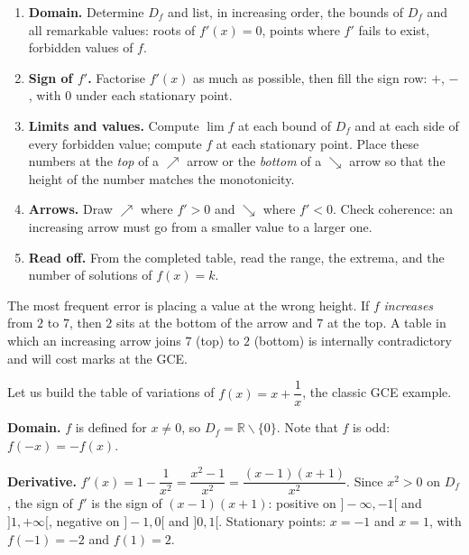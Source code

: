 \documentclass[11pt]{article}
\newcounter{popsec}
\newcounter{popsub}
\newcommand{\courssub}[1]{%
  \stepcounter{popsub}%
  \par\vspace{9pt}\noindent{\popxbold\fontsize{11.5}{13}\selectfont\color{popink}{\color{poporange}\thepopsec.\thepopsub}\hspace{6pt}#1}\par\nopagebreak\vspace{4pt}
}
\def\setminus{\mathbin{\backslash}}\let\smallsetminus\setminus
\begin{document}
\begin{methode}
\begin{enumerate}
\item \textbf{Domain.} Determine $D_f$ and list, in increasing order, the bounds of $D_f$ and all remarkable values: roots of $f'(x)=0$, points where $f'$ fails to exist, forbidden values of $f$.
\item \textbf{Sign of $f'$.} Factorise $f'(x)$ as much as possible, then fill the sign row: $+$, $-$, with $0$ under each stationary point.
\item \textbf{Limits and values.} Compute $\lim f$ at each bound of $D_f$ and at each side of every forbidden value; compute $f$ at each stationary point. Place these numbers at the \emph{top} of a $\nearrow$ arrow or the \emph{bottom} of a $\searrow$ arrow so that the height of the number matches the monotonicity.
\item \textbf{Arrows.} Draw $\nearrow$ where $f'>0$ and $\searrow$ where $f'<0$. Check coherence: an increasing arrow must go from a smaller value to a larger one.
\item \textbf{Read off.} From the completed table, read the range, the extrema, and the number of solutions of $f(x)=k$.
\end{enumerate}
\end{methode}

\begin{attention}
The most frequent error is placing a value at the wrong height. If $f$ \emph{increases} from $2$ to $7$, then $2$ sits at the bottom of the arrow and $7$ at the top. A table in which an increasing arrow joins $7$ (top) to $2$ (bottom) is internally contradictory and will cost marks at the GCE.
\end{attention}

\courssub{A Complete Example: $f(x)=x+\dfrac{1}{x}$}

Let us build the table of variations of $f(x)=x+\dfrac{1}{x}$, the classic GCE example.

\textbf{Domain.} $f$ is defined for $x\neq 0$, so $D_f=\mathbb{R}\setminus\{0\}$. Note that $f$ is odd: $f(-x)=-f(x)$.

\textbf{Derivative.} $f'(x)=1-\dfrac{1}{x^{2}}=\dfrac{x^{2}-1}{x^{2}}=\dfrac{(x-1)(x+1)}{x^{2}}$. Since $x^{2}>0$ on $D_f$, the sign of $f'$ is the sign of $(x-1)(x+1)$: positive on $]-\infty,-1[$ and $]1,+\infty[$, negative on $]-1,0[$ and $]0,1[$. Stationary points: $x=-1$ and $x=1$, with $f(-1)=-2$ and $f(1)=2$.
\end{document}
